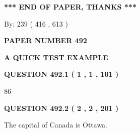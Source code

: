 \documentclass[12pt]{article}
\begin{document}
 
 
 
   
   
 \vspace{0.2in}
 
   
   
   
   
\vspace{1.0in} 
{\textbf{\large{ *** END OF PAPER, THANKS *** }}} 
   
   
\hspace{1.0in} By: 
 239 ( 416 ,  613 )
   
   
   
   
\newpage 
\setcounter{page}{ 
   492001 } 
   
   
   
   
 {\textbf{ \Large{ PAPER NUMBER  492  }}}
   
   
\vspace{0.2in}
   
   
   
   
   
   
 \vspace{0.2in}
{\LARGE {\textbf{ A QUICK TEST EXAMPLE}}}
   
   
  
\vspace{0.2in}
  
{\textbf{\Large{QUESTION
492.1 
 ( 1 , 1 , 101 )
}}}
  
  
 
 
\noindent{}

86
 
 
  
\vspace{0.2in}
  
{\textbf{\Large{QUESTION
492.2 
 ( 2 , 2 , 201 )
}}}
  
  
 
 
\noindent{}
 
 
The capital of Canada is Ottawa.
 
 
 
 
   
   
 \vspace{0.2in}
 
   
   
   
   
\end{document}
